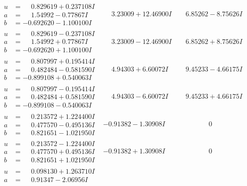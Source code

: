 \documentclass[1p]{elsarticle_modified}
\theoremstyle{definition}
\begin{document}
$$\begin{array}{c|c|c}
\begin{aligned}
u &= \phantom{-}0.829619 + 0.237108 I \\
a &= \phantom{-}1.54992 - 0.77867 I \\
b &= -0.692620 - 1.100100 I\end{aligned}
 & \phantom{-}3.23009 + 12.46900 I & \phantom{-}6.85262 - 8.75626 I \\ \hline\begin{aligned}
u &= \phantom{-}0.829619 - 0.237108 I \\
a &= \phantom{-}1.54992 + 0.77867 I \\
b &= -0.692620 + 1.100100 I\end{aligned}
 & \phantom{-}3.23009 - 12.46900 I & \phantom{-}6.85262 + 8.75626 I \\ \hline\begin{aligned}
u &= \phantom{-}0.807997 + 0.195414 I \\
a &= \phantom{-}0.482484 - 0.581590 I \\
b &= -0.899108 + 0.540063 I\end{aligned}
 & \phantom{-}4.94303 + 6.60072 I & \phantom{-}9.45233 - 4.66175 I \\ \hline\begin{aligned}
u &= \phantom{-}0.807997 - 0.195414 I \\
a &= \phantom{-}0.482484 + 0.581590 I \\
b &= -0.899108 - 0.540063 I\end{aligned}
 & \phantom{-}4.94303 - 6.60072 I & \phantom{-}9.45233 + 4.66175 I \\ \hline\begin{aligned}
u &= \phantom{-}0.213572 + 1.224400 I \\
a &= \phantom{-}0.477570 - 0.495136 I \\
b &= \phantom{-}0.821651 - 1.021950 I\end{aligned}
 & -0.91382 - 1.30908 I & \phantom{-0.000000 } 0 \\ \hline\begin{aligned}
u &= \phantom{-}0.213572 - 1.224400 I \\
a &= \phantom{-}0.477570 + 0.495136 I \\
b &= \phantom{-}0.821651 + 1.021950 I\end{aligned}
 & -0.91382 + 1.30908 I & \phantom{-0.000000 } 0 \\ \hline\begin{aligned}
u &= \phantom{-}0.098130 + 1.263710 I \\
a &= \phantom{-}0.91347 - 2.06956 I \\

\end{aligned}
\end{array}$$
\end{document}
